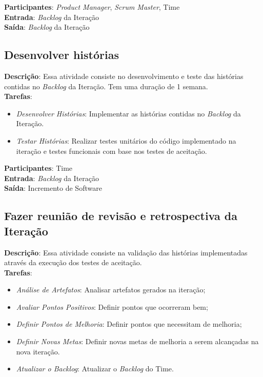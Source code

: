   \textbf{Participantes}: \textit{Product Manager}, \textit{Scrum Master}, Time\\

  \textbf{Entrada}: \textit{Backlog} da Iteração \\

  \textbf{Saída}:   \textit{Backlog} da Iteração\\

\subsection{Desenvolver histórias}
  \textbf{Descrição}: Essa atividade consiste no desenvolvimento e teste das histórias contidas no \textit{Backlog} da Iteração. Tem uma duração de 1 semana. \\

  \textbf{Tarefas}:

  \begin{itemize}
    \item \indent \textit{Desenvolver Histórias}: Implementar as histórias contidas no \textit{Backlog} da Iteração.

   \item \indent \textit{Testar Histórias}: Realizar testes unitários do código implementado na iteração e testes funcionais
   com base nos testes de aceitação.
  \end{itemize}

  \textbf{Participantes}: Time\\

  \textbf{Entrada}: \textit{Backlog} da Iteração \\

  \textbf{Saída}:   Incremento de Software\\

\subsection{Fazer reunião de revisão e retrospectiva da Iteração}
  \textbf{Descrição}: Essa atividade consiste na validação das histórias implementadas através da execução dos testes de aceitação. \\

  \textbf{Tarefas}:
  \begin{itemize}
   \item \indent \textit{Análise de Artefatos}: Analisar artefatos gerados na iteração;

   \item \indent \textit{Avaliar Pontos Positivos}: Definir pontos que ocorreram bem;

   \item \indent \textit{Definir Pontos de Melhoria}: Definir pontos que necessitam de melhoria;

   \item \indent \textit{Definir Novas Metas}: Definir novas metas de melhoria a serem alcançadas na nova iteração.
   
   \item \indent \textit{Atualizar o \textit{Backlog}}: Atualizar o \textit{Backlog} do Time.
  \end{itemize}

